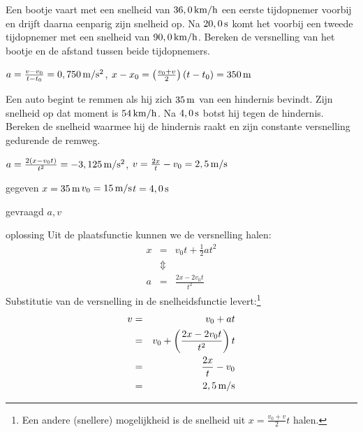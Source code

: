 \documentclass{ximera}
\begin{document}
\begin{exercise} Een bootje vaart met een snelheid van $36,0\rm\,km/h$ een eerste tijdopnemer voorbij en drijft daarna eenparig zijn snelheid op. Na $20,0\rm\,s$ komt het voorbij een tweede tijdopnemer met een snelheid van $90,0\rm\,km/h$. Bereken de versnelling van het bootje en de afstand tussen beide tijdopnemers.
\begin{oplossing}
\newline
$a=\frac{v-v_0}{t-t_0}=0,750\rm\,m/s^2$, $x-x_0=\left(\frac{v_0+v}{2}\right)(t-t_0)=350\rm\,m$
\end{oplossing}

\end{exercise}

\begin{exercise} Een auto begint te remmen als hij zich $35\rm\,m$ van een hindernis bevindt. Zijn snelheid op dat moment is $54\rm\,km/h$. Na $4,0\rm\,s$ botst hij tegen de hindernis. Bereken de snelheid waarmee hij de hindernis raakt en zijn constante versnelling gedurende de remweg.
\begin{oplossing}
$a=\frac{2(x-v_0t)}{t^2}=-3,125\rm\,m/s^2$, $v=\frac{2x}{t}-v_0=2,5\rm\,m/s$
\end{oplossing}
\begin{oplossing}
\item[gegeven]$x=35\rm\,m$\newline$v_0=15\rm\,m/s$\newline$t=4,0\rm\,s$
\item[gevraagd]$a, v$
\item[oplossing]Uit de plaatsfunctie kunnen we de versnelling halen:
\begin{eqnarray*}
x&=&v_0t+\frac{1}{2}at^2\\
&\Updownarrow&\\
a&=&\frac{2x-2v_0t}{t^2}
\end{eqnarray*}
Substitutie van de versnelling in de snelheidsfunctie levert:\footnote{Een andere (snellere) mogelijkheid is de snelheid uit $x=\frac{v_0+v}{2}t$ halen.}
\begin{eqnarray*}
v&=&v_0+at\\
&=&v_0+\left(\frac{2x-2v_0t}{t^2}\right)t\\
&=&\frac{2x}{t}-v_0\\
&=&2,5\rm\,m/s
\end{eqnarray*}
\end{oplossing}

\end{exercise}
\end{document}
